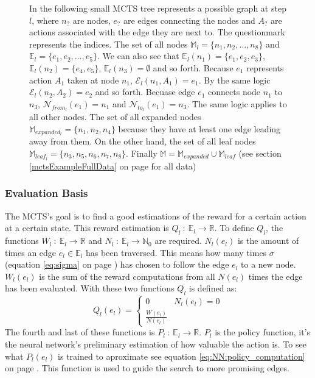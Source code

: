\documentclass[12pt]{article}
\newcommand{\equationref}[1]{equation \ref{#1} on page \pageref{#1}}
\newcommand{\sectionref}[1]{section \ref{#1} on page \pageref{#1}}
\begin{document}
\begin{figure}[H]
  \centering
  
  \captionsetup{width=.9\linewidth}
  \caption{In the following small MCTS tree represents a possible graph at step \(l\), where \(n_?\) are nodes, \(e_?\) are edges connecting the nodes and \(A_?\) are actions associated with the edge they are next to. The questionmark represents the indices. The set of all nodes \(\mathbb M_l = \{n_1, n_2, \dots, n_8\}\) and \(\mathbb E_l = \{e_1, e_2, \dots, e_5\}\). We can also see that \(\mathbb E_l(n_1) = \{e_1, e_2, e_3\}\), \(\mathbb E_l(n_2) = \{e_4, e_5\}\), \(\mathbb E_l(n_3) = \emptyset\) and so forth. Because \(e_1\) represents action \(A_1\) taken at node \(n_1\), \(\mathcal E_l(n_1, A_1) = e_1\). By the same logic \(\mathcal E_l(n_2, A_2) = e_2\) and so forth. Becuase edge \(e_1\) connects node \(n_1\) to \(n_3\), \(\mathcal N_{from_l}(e_1) = n_1\) and \(\mathcal N_{to_l}(e_1) = n_3\). The same logic applies to all other nodes. The set of all expanded nodes \(\mathbb M_{expanded_l} = \{n_1, n_2, n_4\}\) because they have at least one edge leading away from them. On the other hand, the set of all leaf nodes \(\mathbb M_{leaf_l}  = \{n_3, n_5, n_6, n_7, n_8\}\). Finally \(\mathbb M = \mathbb M_{expanded} \cup \mathbb M_{leaf}\)
(see \sectionref{mctsExampleFullData} for all data)}
	\label{fig:mcts:example}
\end{figure}

\subsubsection{Evaluation Basis}
The MCTS's goal is to find a good estimations of the reward for a certain action at a certain state. This reward estimation is \(Q_l~:~\mathbb{E}_{l}\to \mathbb{R}\). To define \(Q_l\), the functions \(W_l~:~\mathbb{E}_{l}\to\mathbb{R}\) and \(N_l~:~\mathbb{E}_{l}\to\mathbb{N}_0\) are required. \(N_l(e_l)\) is the amount of times an edge \(e_l\in\mathbb{E}_{l}\) has been traversed. This means how many times \(\sigma\) (\equationref{eq:sigma}) has chosen to follow the edge \(e_l\) to a new node. \(W_l(e_l)\) is the sum of the reward computations from all \(N(e_l)\) times the edge has been evaluated. With these two functions \(Q_l\) is defined as:
\begin{equation}\label{eq:Ql}
Q_l(e_l) = 
\begin{cases}
0 & N_l(e_l) = 0\\
\frac{W(e_l)}{N(e_l)} &
\end{cases}
\end{equation}
The fourth and last of these functions is \(P_l~:~\mathbb{E}_{l}\to\mathbb{R}\). \(P_l\) is the policy function, it's the neural network's preliminary estimation of how valuable the action is. To see what \(P_l(e_l)\) is trained to aproximate see \equationref{eq:NN:policy_computation}.
This function is used to guide the search to more promising edges.
\end{document}
